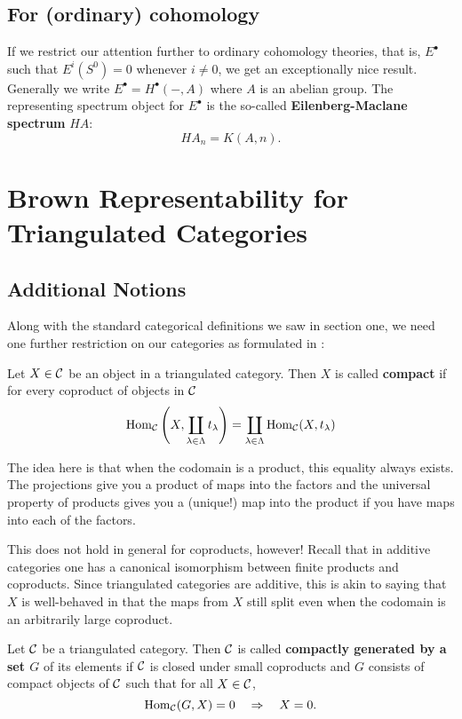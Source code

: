 \documentclass[12pt]{article}
\begin{document}
\subsection{For (ordinary) cohomology}
If we restrict our attention further to ordinary cohomology theories, that is, $E^\bullet$ such that $E^i(S^0)=0$ whenever $i\ne 0$,
we get an exceptionally nice result. Generally we write $E^\bullet=H^\bullet(-,A)$ where $A$ is an abelian group. 
The representing spectrum object for $E^\bullet$ is the so-called \textbf{Eilenberg-Maclane spectrum} $HA$:
\[HA_n=K(A,n).\]

\section{Brown Representability for Triangulated Categories}
\subsection{Additional Notions}
Along with the standard categorical definitions we saw in section one, we need one further restriction on our categories as formulated in \cite{neeman-article}:
\begin{defn}
	Let $X\in\mathcal{C}$ be an object in a triangulated category. Then $X$ is called \textbf{compact} if for every coproduct of objects in $\mathcal{C}$
	\[\operatorname{Hom}_{\mathcal{C}}\left(X,\coprod_{\lambda\in\Lambda}t_\lambda\right)=\coprod_{\lambda\in\Lambda}\operatorname{Hom}_{\mathcal{C}}(X,t_\lambda)\]
\end{defn}
\begin{rmk}
	The idea here is that when the codomain is a product, this equality always exists. The projections give you 
	a product of maps into the factors and the universal property of products gives you a (unique!) map into the product if you
	have maps into each of the factors.

	This does not hold in general for coproducts, however! Recall that in additive categories 
	one has a canonical isomorphism between finite products and coproducts. Since triangulated 
	categories are additive, this is akin to saying that $X$ is well-behaved in that the maps 
	from $X$ still split even when the codomain is an arbitrarily large coproduct.
\end{rmk}
\begin{defn}
	Let $\mathcal{C}$ be a triangulated category. Then $\mathcal{C}$ is called \textbf{compactly generated by a set $G$} of its elements 
	if $\mathcal{C}$ is closed under small coproducts and $G$ consists of compact objects of $\mathcal{C}$ such that for all $X\in\mathcal{C}$,
	\[\operatorname{Hom}_{\mathcal{C}}(G,X)=0\quad\Rightarrow\quad X=0.\]
\end{defn}
\end{document}
